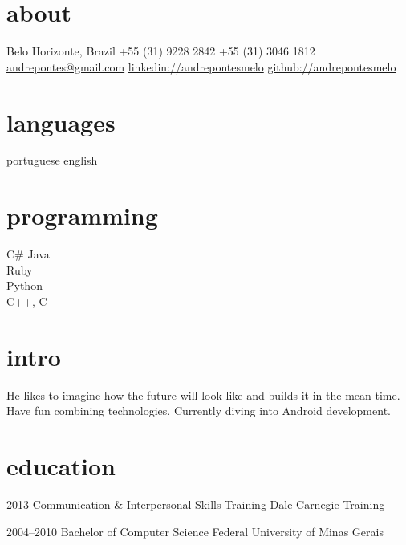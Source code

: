 \documentclass[]{friggeri-cv}
\begin{document}


\begin{aside} %
\section{about}
Belo Horizonte, Brazil
+55 (31) 9228 2842
+55 (31) 3046 1812
~
\href{mailto:andrepontes@gmail.com}{andrepontes@gmail.com}
\href{https://br.linkedin.com/in/andrepontesmelo}{linkedin://andrepontesmelo}
\href{https://github.com/andrepontesmelo}{github://andrepontesmelo}
\section{languages}
portuguese
english
\section{programming}
C\#
Java\\Ruby\\Python\\C++, C
\end{aside}

\section{intro}
He likes to imagine how the future will look like and builds it in the mean time. Have fun combining technologies. Currently diving into Android development.


\section{education}

\begin{entrylist}


\entry
{2013}
{Communication \& Interpersonal {\normalfont Skills Training}}
{Dale Carnegie Training}

\entry
{2004--2010}
{{\normalfont Bachelor of} Computer Science}
{Federal University of Minas Gerais}

\end{entrylist}
\end{document}
